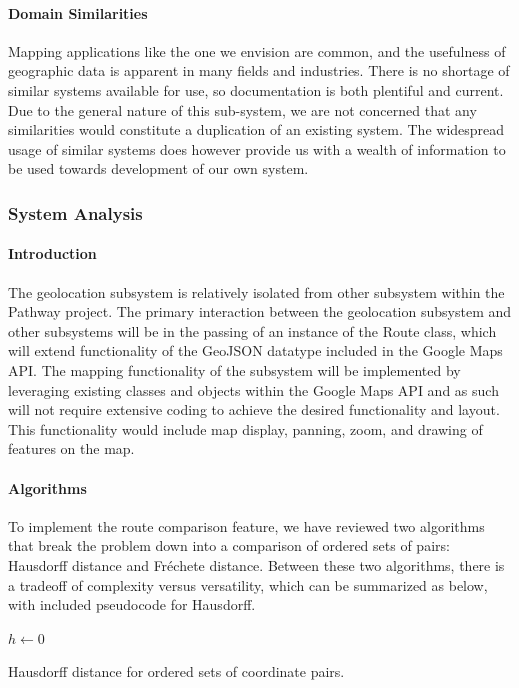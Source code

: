\documentclass{article}
\begin{document}
\paragraph{Domain Similarities}
Mapping applications like the one we envision are common, and the usefulness of geographic data is apparent in many fields and industries. There is no shortage of similar systems available for use, so documentation is both plentiful and current. Due to the general nature of this sub-system, we are not concerned that any similarities would constitute a duplication of an existing system. The widespread usage of similar systems does however provide us with a wealth of information to be used towards development of our own system.

\subsubsection{System Analysis}
\paragraph{Introduction}
The geolocation subsystem is relatively isolated from other subsystem within the Pathway project. The primary interaction between the geolocation
subsystem and other subsystems will be in the passing of an instance of the Route class, which will extend functionality of the GeoJSON datatype
included in the Google Maps API. The mapping functionality of the subsystem will be implemented by leveraging existing classes and objects within
the Google Maps API and as such will not require extensive coding to achieve the desired functionality and layout.
This functionality would include map display, panning, zoom, and drawing of features on the map.


\paragraph{Algorithms}
To implement the route comparison feature, we have reviewed two algorithms that break the problem down into a comparison of ordered sets of pairs:
Hausdorff distance and Fréchete distance. Between these two algorithms, there is a tradeoff of complexity versus versatility,
which can be summarized as below, with included pseudocode for Hausdorff.

\begin{algorithm}[h]
\SetAlgoLined
$h \gets 0$\\
\caption{Hausdorff distance for ordered sets of coordinate pairs.}
\end{algorithm}
\end{document}
